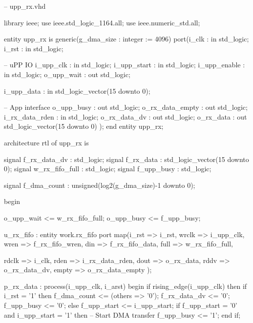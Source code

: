 \begin{VHDLlisting}[tabsize=2]
-- upp_rx.vhd

library ieee;
    use ieee.std_logic_1164.all;
    use ieee.numeric_std.all;
	
entity upp_rx is
    generic(g_dma_size : integer := 4096)
    port(i_clk           : in    std_logic;
         i_rst           : in    std_logic;
		 
         -- uPP IO
         i_upp_clk       : in    std_logic; 
         i_upp_start     : in    std_logic;
         i_upp_enable    : in    std_logic;
         o_upp_wait      :   out std_logic;
		 
         i_upp_data      : in    std_logic_vector(15 downto 0);
		 
         -- App interface
         o_upp_busy      :   out std_logic;
         o_rx_data_empty :   out std_logic;
         i_rx_data_rden  : in    std_logic;
         o_rx_data_dv    :   out std_logic;
         o_rx_data       :   out std_logic_vector(15 downto 0)	
    );
end entity upp_rx;


architecture rtl of upp_rx is
	
    signal f_rx_data_dv   : std_logic;
    signal f_rx_data      : std_logic_vector(15 downto 0);
    signal w_rx_fifo_full : std_logic;
    signal f_upp_busy     : std_logic;
	
    signal f_dma_count    : unsigned(log2(g_dma_size)-1 downto 0);
	
begin

    o_upp_wait <= w_rx_fifo_full;
    o_upp_busy <= f_upp_busy; 

    u_rx_fifo : entity work.rx_fifo
    port map(i_rst => i_rst,
             wrclk => i_upp_clk, 
             wren  => f_rx_fifo_wren,
             din   => f_rx_fifo_data,
             full  => w_rx_fifo_full,
	
             rdclk => i_clk,
             rden  => i_rx_data_rden,
             dout  => o_rx_data,
             rddv  => o_rx_data_dv,
             empty => o_rx_data_empty	
    );

    p_rx_data : process(i_upp_clk, i_arst)
    begin
        if rising_edge(i_upp_clk) then
            if i_rst = '1' then
                f_dma_count <= (others => '0');
                f_rx_data_dv <= '0';
                f_upp_busy <= '0';
            else
                f_upp_start <= i_upp_start;
                if f_upp_start = '0' and i_upp_start = '1' then	
                    -- Start DMA transfer
                    f_upp_busy <= '1';
                end if;
				

\end{VHDLlisting}
